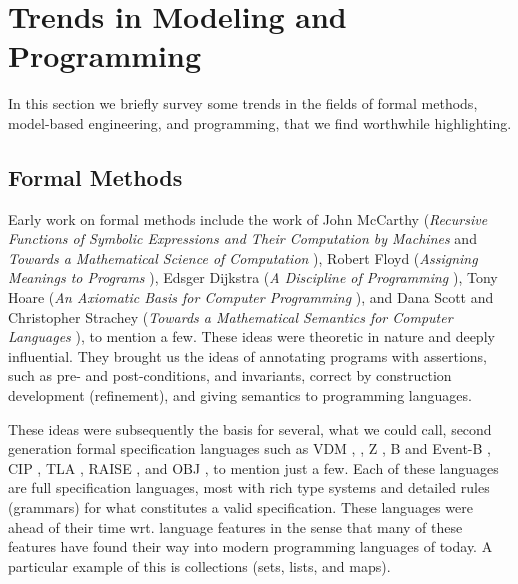 
\section{Trends in Modeling and Programming}
\label{sec:trends}

In this section we briefly survey some trends in the fields of
formal methods, model-based engineering, and programming, that we find worthwhile highlighting.


\subsection{Formal Methods}

Early work on formal methods include the work of John McCarthy 
({\em Recursive Functions of Symbolic Expressions and Their 
Computation by Machines} \cite{Mc60} and 
{\em Towards a Mathematical Science of Computation} \cite{Mc62a}), 
Robert Floyd ({\em Assigning Meanings to Programs} \cite{Flo67}), 
Edsger Dijkstra ({\em A Discipline of Programming} \cite{EWD1}), 
Tony Hoare ({\em An Axiomatic Basis for Computer Programming} 
\cite{Hoa69}), and Dana Scott and Christopher 
Strachey ({\em Towards a Mathematical Semantics for Computer 
Languages} \cite{Sco71}), to mention a few. These ideas were 
theoretic in nature and deeply influential. They brought us the 
ideas of  annotating programs with assertions, such as pre- and 
post-conditions, and invariants, correct by construction 
development (refinement), and giving semantics to programming 
languages. 

These ideas were subsequently the basis for several, what we could 
call, second generation formal specification languages such as 
VDM 
\cite{vdm78,bjoerner-jones-82,jones90},  
\vdmpp{} \cite{vdmplusplus05},
Z \cite{Spivey-Z-92}, B and Event-B \cite{abrial-eventb-10}, CIP 
\cite{cip-1985}, TLA \cite{lamport-TLA-1994}, RAISE 
\cite{raise92},
and OBJ 
\cite{futatsugi-obj-1985}, to mention just a few. Each of these 
languages are full 
specification languages, most with rich type systems and detailed 
rules (grammars) for what constitutes a valid specification. These 
languages were ahead of their time wrt. language features in the 
sense that many of these features have found their 
way into modern programming languages of today. A particular
example of this is collections (sets, lists, and maps).

